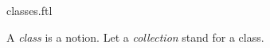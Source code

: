 \documentclass{stex}
\begin{document}
\begin{smodule}{classes.ftl}


\begin{fakeforthel}
  \begin{signature}[for={class,collection}]
    A \emph{class} is a notion.
    Let a \emph{collection} stand for a class.
  \end{signature}
\end{fakeforthel}

\end{smodule}
\end{document}
